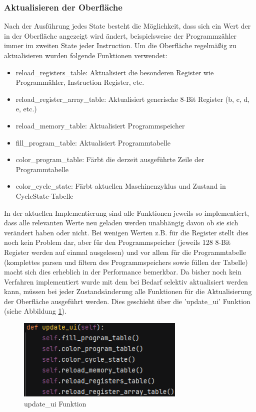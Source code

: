 \documentclass[12pt]{article}
\newcommand{\imgSpaceBefore}{\vspace{10pt}}
\begin{document}
\subsubsection{Aktualisieren der Oberfläche}
Nach der Ausführung jedes State besteht die Möglichkeit, dass sich ein Wert der in der Oberfläche angezeigt wird ändert, beispielsweise der Programmzähler immer im zweiten State jeder Instruction. Um die Oberfläche regelmäßig zu aktualisieren wurden folgende Funktionen verwendet:\imgSpaceBefore

\begin{itemize}
	\item reload\_registers\_table: Aktualisiert die besonderen Register wie Programmähler, Instruction Register, etc.
	\item reload\_register\_array\_table: Aktualisiert generische 8-Bit Register (b, c, d, e, etc.)
	\item reload\_memory\_table: Aktualisiert Programmspeicher
	\item fill\_program\_table: Aktualisiert Programmtabelle
	\item color\_program\_table: Färbt die derzeit ausgeführte Zeile der Programmtabelle
	\item color\_cycle\_state: Färbt aktuellen Maschinenzyklus und Zustand in CycleState-Tabelle
\end{itemize}
\noindent
In der aktuellen Implementierung sind alle Funktionen jeweils so implementiert, dass alle relevanten Werte neu geladen werden unabhängig davon ob sie sich verändert haben oder nicht. Bei wenigen Werten z.B. für die Register stellt dies noch kein Problem dar, aber für den Programmspeicher (jeweils 128 8-Bit Register werden auf einmal ausgelesen) und vor allem für die Programmtabelle (komplettes parsen und filtern des Programmspeichers sowie füllen der Tabelle) macht sich dies erheblich in der Performance bemerkbar. Da bisher noch kein Verfahren implementiert wurde mit dem bei Bedarf selektiv aktualisiert werden kann, müssen bei jeder Zustandsänderung alle Funktionen für die Aktualisierung der Oberfläche ausgeführt werden. Dies geschieht über die 'update\_ui' Funktion (siehe Abbildung \ref{fig:updateUI}).\imgSpaceBefore

\begin{figure}[H]
\centering
\includegraphics[width=8cm]{bilder/updateUI}
\caption{update\_ui Funktion}
\label{fig:updateUI}
\end{figure}
\end{document}
